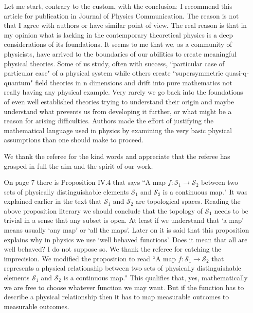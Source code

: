 \documentclass[10pt]{article}
\begin{document}
\begin{response}{Let me start, contrary to the custom, with the conclusion: I recommend this article
		for publication in Journal of Physics Communication. The reason is not that I agree with
		authors or have similar point of view. The real reason is that in my opinion what is lacking
		in the contemporary theoretical physics is a deep considerations of its foundations. It seems
		to me that we, as a community of physicists, have arrived to the boundaries of our abilities
		to create meaningful physical theories. Some of us study, often with success, ``particular
		case of particular case" of a physical system while others create ``supersymmetric quasi-q-
		quantum" field theories in n dimensions and drift into pure mathematics not really having
		any physical example. Very rarely we go back into the foundations of even well established
		theories trying to understand their origin and maybe understand what prevents us from
		developing it further, or what might be a reason for arising difficulties. Authors made the
		effort of justifying the mathematical language used in physics by examining the very basic
		physical assumptions than one should make to proceed.}

We thank the referee for the kind words and appreciate that the referee has grasped in full the aim and the spirit of our work.

\end{response}
\begin{response}{On page 7 there is Proposition IV.4 that says ``A map $f : \mathcal{S}_1 \to \mathcal{S}_2$ between two sets
		of physically distinguishable elements $\mathcal{S}_1$ and $\mathcal{S}_2$ is a continuous map." It was explained
		earlier in the text that $\mathcal{S}_1$ and $\mathcal{S}_2$ are topological spaces. Reading the above proposition
		literary we should conclude that the topology of $\mathcal{S}_1$ needs to be trivial in a sense that any
		subset is open. At least if we understand that `a map' means usually `any map' or `all
		the maps'. Later on it is said that this proposition explains why in physics we use `well
		behaved functions'. Does it mean that all are well behaved? I do not suppose so.}
 We thank the referee for catching the imprecision. We modified the proposition to read ``A map $f:\mathcal{S}_1 \rightarrow \mathcal{S}_2$ that represents a physical relationship between two sets of physically distinguishable elements $\mathcal{S}_1$ and $\mathcal{S}_2$ is a continuous map." This qualifies that, yes, mathematically we are free to choose whatever function we may want. But if the function has to describe a physical relationship then it has to map measurable outcomes to measurable outcomes.
\end{response}
\end{document}
